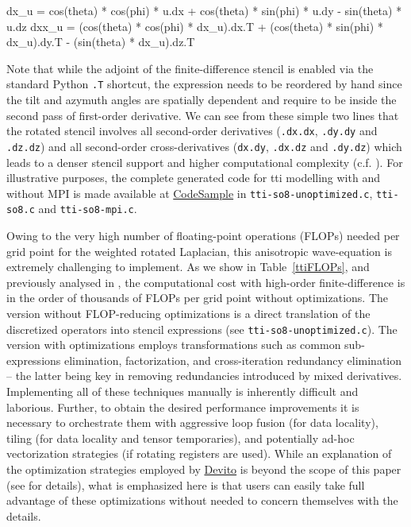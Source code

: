 \documentclass[10pt, conference]{IEEEtran}
\newcommand{\devito}{\href{https://github.com/devitocodes/devito}{Devito} }
\begin{document}
\begin{python}[label=rotxpy, caption=Rotated finite-difference with symbolic shortcuts]
dx_u = cos(theta) * cos(phi) * u.dx +
       cos(theta) * sin(phi) * u.dy -
       sin(theta) * u.dz
dxx_u = (cos(theta) * cos(phi) * dx_u).dx.T +
        (cos(theta) * sin(phi) * dx_u).dy.T -
        (sin(theta) * dx_u).dz.T
\end{python}

Note that while the adjoint of the finite-difference stencil is enabled via the
standard Python \texttt{.T} shortcut, the expression needs to be reordered by hand
since the tilt and azymuth angles are spatially dependent and require to be
inside the second pass of first-order derivative. We can see from these simple
two lines that the rotated stencil involves all second-order derivatives
(\texttt{.dx.dx}, \texttt{.dy.dy} and \texttt{.dz.dz}) and all second-order
cross-derivatives (\texttt{dx.dy}, \texttt{.dx.dz} and \texttt{.dy.dz}) which
leads to a denser stencil support and higher computational complexity
(c.f. \cite{louboutin2016ppf}). For illustrative purposes, the complete
generated code for tti modelling with and without MPI is made available
at \href{https://github.com/mloubout/SC20Paper/tree/master/codesamples}{CodeSample}
in \texttt{tti-so8-unoptimized.c}, \texttt{tti-so8.c} and \texttt{tti-so8-mpi.c}.

Owing to the very high number of floating-point operations (FLOPs) needed per
grid point for the weighted rotated Laplacian, this anisotropic wave-equation
is extremely challenging to implement. As we show in Table~\ref{ttiFLOPs}, and
previously analysed in \cite{louboutin2016ppf}, the computational cost with
high-order finite-difference is in the order of thousands of FLOPs per grid
point without optimizations. The version without FLOP-reducing optimizations is
a direct translation of the discretized operators into stencil expressions (see
\texttt{tti-so8-unoptimized.c}). The version with optimizations employs
transformations such as common sub-expressions elimination, factorization, and
cross-iteration redundancy elimination -- the latter being key in removing
redundancies introduced by mixed derivatives. Implementing all of these
techniques manually is inherently difficult and laborious. Further, to obtain
the desired performance improvements it is necessary to orchestrate them with
aggressive loop fusion (for data locality), tiling (for data locality and
tensor temporaries), and potentially ad-hoc vectorization strategies (if
rotating registers are used). While an explanation of the optimization
strategies employed by \devito is beyond the scope of this paper (see
\cite{devito-compiler} for details), what is emphasized here is that users
can easily take full advantage of these optimizations without needed to
concern themselves with the details.
\end{document}

